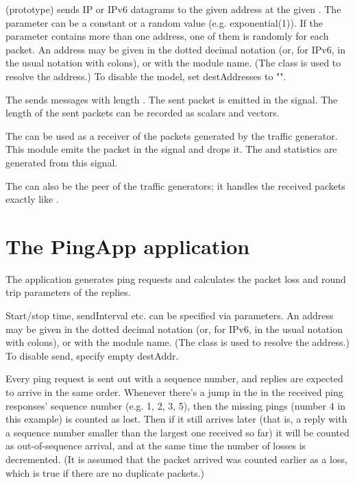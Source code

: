  (prototype) sends IP or IPv6 datagrams to the
given address at the given .
The  parameter can be a constant or a random value (e.g. exponential(1)).
If the  parameter contains more than one address, one
of them is randomly for each packet. An address may be given in the
dotted decimal notation (or, for IPv6, in the usual notation with colons),
or with the module name. (The  class is used to resolve
the address.) To disable the model, set destAddresses to "".

The  sends messages with length .
The sent packet is emitted in the  signal.
The length of the sent packets can be recorded as scalars and vectors.

The  can be used as a receiver of the packets
generated by the traffic generator. This module emits the packet
in the  signal and drops it. The 
and  statistics are generated from this signal.

The  can also be the peer of the traffic generators;
it handles the received packets exactly like .

\section{The PingApp application}

The  application
generates ping requests and calculates the packet loss and round trip
parameters of the replies.

Start/stop time, sendInterval etc. can be specified via parameters. An address
may be given in the dotted decimal notation (or, for IPv6, in the usual
notation with colons), or with the module name.
(The  class is used to resolve the address.)
To disable send, specify empty destAddr.

Every ping request is sent out with a sequence number, and replies are
expected to arrive in the same order. Whenever there's a jump in the
in the received ping responses' sequence number (e.g. 1, 2, 3, 5), then
the missing pings (number 4 in this example) is counted as lost.
Then if it still arrives later (that is, a reply with a sequence number
smaller than the largest one received so far) it will be counted as
out-of-sequence arrival, and at the same time the number of losses is
decremented. (It is assumed that the packet arrived was counted earlier as a loss,
which is true if there are no duplicate packets.)

